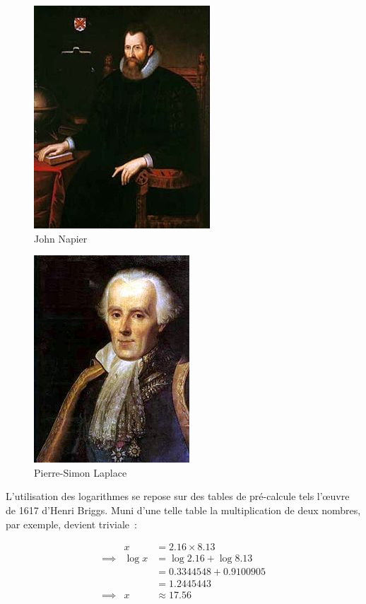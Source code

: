 \begin{minipage}[H]{0.49\linewidth}
  \begin{figure}[H]
  \centering
  \includegraphics[height=0.15\paperheight]{../resources/illustrations/napier}
  \caption{John Napier}
  \end{figure}
\end{minipage}
\begin{minipage}[H]{0.49\linewidth}
  \begin{figure}[H]
  \centering
  \includegraphics[height=0.15\paperheight]{../resources/illustrations/laplace}
  \caption{Pierre-Simon Laplace}
  \end{figure}
\end{minipage}
L'utilisation des logarithmes se repose sur des tables de pré-calcule tels l'\oe{}uvre de 1617 d'Henri Briggs. Muni d'une telle table la multiplication de deux nombres, par exemple, devient triviale~:

\begin{eqnarray}
                    &x            &= 2.16\times{8.13}              \nonumber \\
        \implies{}  &\log{x}      &= \log{2.16}+\log{8.13}         \nonumber \\
                    &             &= 0.3344548 + 0.9100905         \nonumber \\
                    &             &= 1.2445443                     \nonumber \\
        \implies{}  &x            &\approx{17.56}                   \nonumber \\
\end{eqnarray}

